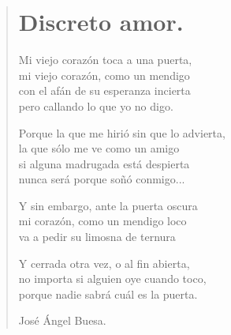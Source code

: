 \documentclass[11pt, portrait, twoside, notitlepage, openright]{book}
\begin{document}
\newpage
\begin{verse}
\begin{center}
\section{Discreto amor.}
\end{center}
Mi viejo corazón toca a una puerta,\\
mi viejo corazón, como un mendigo\\
con el afán de su esperanza incierta\\
pero callando lo que yo no digo.
\newline

Porque la que me hirió sin que lo advierta,\\
la que sólo me ve como un amigo\\
si alguna madrugada está despierta\\
nunca será porque soñó conmigo...
\newline

Y sin embargo, ante la puerta oscura\\
mi corazón, como un mendigo loco\\
va a pedir su limosna de ternura
\newline

Y cerrada otra vez, o al fin abierta,\\
no importa si alguien oye cuando toco,\\
porque nadie sabrá cuál es la puerta.
\newline

José Ángel Buesa.
\end{verse}
\end{document}
